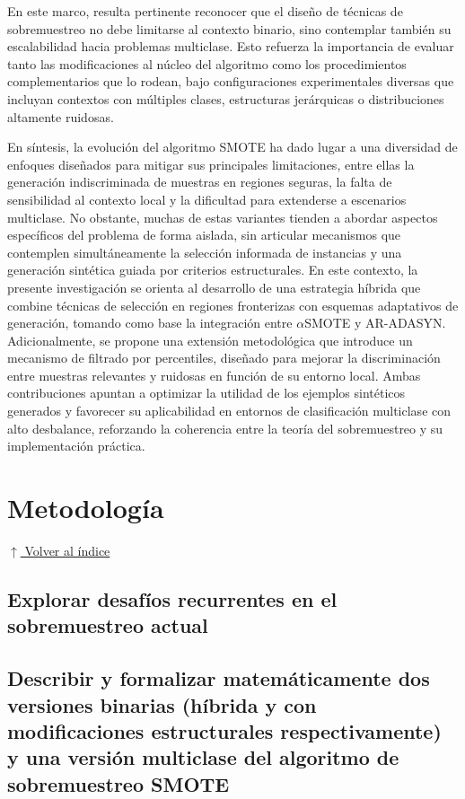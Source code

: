 \documentclass[12pt,a4paper]{article}
\begin{document}
En este marco, resulta pertinente reconocer que el diseño de técnicas de sobremuestreo no debe limitarse al contexto binario, sino contemplar también su escalabilidad hacia problemas multiclase. Esto refuerza la importancia de evaluar tanto las modificaciones al núcleo del algoritmo como los procedimientos complementarios que lo rodean, bajo configuraciones experimentales diversas que incluyan contextos con múltiples clases, estructuras jerárquicas o distribuciones altamente ruidosas.

En síntesis, la evolución del algoritmo SMOTE ha dado lugar a una diversidad de enfoques diseñados para mitigar sus principales limitaciones, entre ellas la generación indiscriminada de muestras en regiones seguras, la falta de sensibilidad al contexto local y la dificultad para extenderse a escenarios multiclase. No obstante, muchas de estas variantes tienden a abordar aspectos específicos del problema de forma aislada, sin articular mecanismos que contemplen simultáneamente la selección informada de instancias y una generación sintética guiada por criterios estructurales. En este contexto, la presente investigación se orienta al desarrollo de una estrategia híbrida que combine técnicas de selección en regiones fronterizas con esquemas adaptativos de generación, tomando como base la integración entre $ \alpha $SMOTE y AR-ADASYN. Adicionalmente, se propone una extensión metodológica que introduce un mecanismo de filtrado por percentiles, diseñado para mejorar la discriminación entre muestras relevantes y ruidosas en función de su entorno local. Ambas contribuciones apuntan a optimizar la utilidad de los ejemplos sintéticos generados y favorecer su aplicabilidad en entornos de clasificación multiclase con alto desbalance, reforzando la coherencia entre la teoría del sobremuestreo y su implementación práctica.



\section{Metodología} \noindent\hyperlink{toc}{\small$\uparrow$ Volver al índice}
\subsection{Explorar desafíos recurrentes en el sobremuestreo actual}
\subsection{Describir y formalizar matemáticamente dos versiones binarias (híbrida y con modificaciones estructurales respectivamente) y una versión multiclase del algoritmo de sobremuestreo SMOTE}
\end{document}
